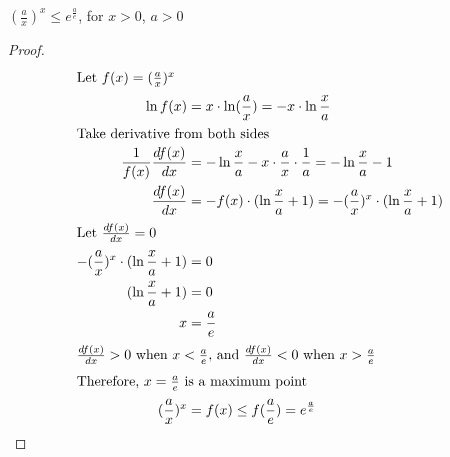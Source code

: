 \begin{lemma}
\label{lemma:(1x)x}

$(\frac{a}{x})^x \le e^\frac{a}{e}$, for $x > 0$, $a > 0$

\end{lemma}

\begin{proof}

\begin{align}
\shortintertext{Let $f(x) = (\frac{a}{x})^x $}
    \ln f(x) &= x \cdot \ln (\frac{a}{x}) \nonumber = - x \cdot \ln \frac{x}{a} \\
\shortintertext{Take derivative from both sides}
    \frac{1}{f(x)} \frac{df(x)}{dx} &= -\ln \frac{x}{a} - x \cdot \frac{a}{x} \cdot \frac{1}{a} = -\ln \frac{x}{a} - 1 \nonumber \\
    \frac{df(x)}{dx} &= - f(x) \cdot (\ln \frac{x}{a} + 1) \nonumber = - (\frac{a}{x})^x \cdot (\ln \frac{x}{a} + 1) \\
\shortintertext{Let $\frac{df(x)}{dx} = 0$}
    - (\frac{a}{x})^x \cdot (\ln \frac{x}{a} + 1) &= 0 \nonumber \\
    (\ln \frac{x}{a} + 1) &= 0 \nonumber \\
    x &= \frac{a}{e} \nonumber \\
\shortintertext{$\frac{df(x)}{dx} > 0$ when $x < \frac{a}{e}$, and $\frac{df(x)}{dx} < 0$ when $x > \frac{a}{e}$}
\shortintertext{Therefore, $x = \frac{a}{e}$ is a maximum point}
    (\frac{a}{x})^x &= f(x) \le f(\frac{a}{e}) = {e}^\frac{a}{e}
\end{align}

\end{proof}

